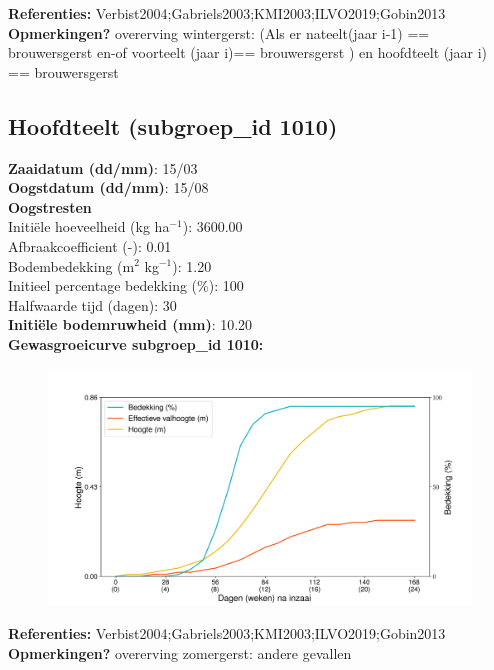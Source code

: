\documentclass{article}
\begin{document}
  \textbf{Referenties:} Verbist2004;Gabriels2003;KMI2003;ILVO2019;Gobin2013 \vspace{0.10cm} \\ 
  \textbf{Opmerkingen?} overerving wintergerst: (Als er nateelt(jaar i-1) == brouwersgerst en-of voorteelt (jaar i)== brouwersgerst ) en hoofdteelt (jaar i) == brouwersgerst \vspace{0.10cm} \\ 
 \newpage 
 \subsection{Hoofdteelt (subgroep\_id 1010)} 
  \textbf{Zaaidatum (dd/mm)}: 15/03  \vspace{0.10cm} \\ 
  \textbf{Oogstdatum (dd/mm)}: 15/08  \vspace{0.10cm} \\ 
  \textbf{Oogstresten} \vspace{0.05cm} \\ 
  \tab Initi\"{e}le hoeveelheid (kg ha$^{-1}$): 3600.00 \vspace{0.05cm} \\ 
  \tab Afbraakcoefficient (-): 0.01 \vspace{0.05cm} \\ 
  \tab Bodembedekking (m$^2$ kg$^{-1}$): 1.20 \vspace{0.05cm} \\ 
  \tab Initieel percentage bedekking (\%): 100 \vspace{0.05cm} \\ 
  \tab Halfwaarde tijd (dagen): 30 \vspace{0.05cm} \\ 
  \textbf{Initi\"{e}le bodemruwheid (mm)}: 10.20 \vspace{0.05cm} \\ 
  \textbf{Gewasgroeicurve subgroep\_id 1010:} 
 \begin{center} \begin{figure}[H] \includegraphics[width=12.5cm]{temp/1010.png} \end{figure} \end{center} 
  \textbf{Referenties:} Verbist2004;Gabriels2003;KMI2003;ILVO2019;Gobin2013 \vspace{0.10cm} \\ 
  \textbf{Opmerkingen?} overerving zomergerst: andere gevallen \vspace{0.10cm} \\ 
 \newpage 
\end{document}
